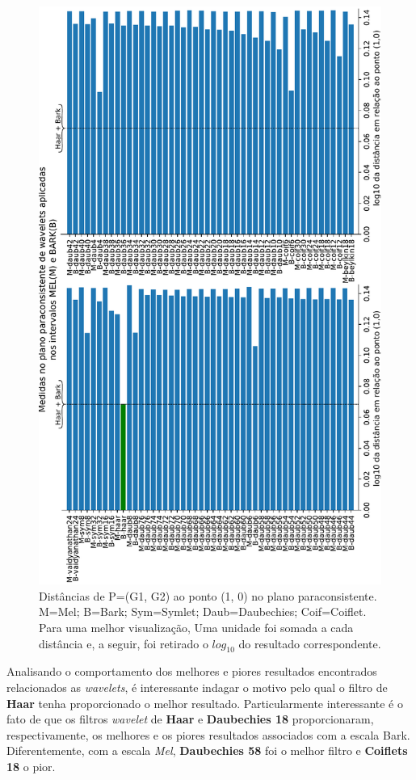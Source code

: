 	\newpage
	\begin{landscape}
		\begin{figure}[h]
			\centering
			\includegraphics[width=0.6\linewidth,angle=-90]{images/results/paraconsistentPlane/ParaconsistentFull.pdf}
			\caption{Distâncias de P=(G1, G2) ao ponto (1, 0) no plano paraconsistente. M=Mel; B=Bark; Sym=Symlet; Daub=Daubechies; Coif=Coiflet. Para uma melhor visualização, Uma unidade foi somada a cada distância e, a seguir, foi retirado o $log_{10}$ do resultado correspondente.}
			\label{fig:paraconsistentfull}
		\end{figure}
	\end{landscape}
	\newpage

	\FloatBarrier

	\par Analisando o comportamento dos melhores e piores resultados encontrados relacionados as \textit{wavelets}, é interessante indagar o motivo pelo qual o filtro de \textbf{Haar} tenha proporcionado o melhor resultado. Particularmente interessante é o fato de que os filtros \textit{wavelet} de \textbf{Haar} e \textbf{Daubechies 18} proporcionaram, respectivamente, os melhores e os piores resultados associados com a escala Bark. Diferentemente, com a escala \textit{Mel}, \textbf{Daubechies 58} foi o melhor filtro e \textbf{Coiflets 18} o pior. \\
	
